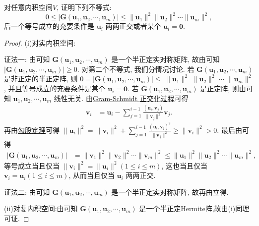 \documentclass[../../main.tex]{subfiles}
\begin{document}
\begin{proposition}\label{proposition:例9.16}
对任意内积空间$V$,
证明下列不等式:
\[
0 \leqslant  |\boldsymbol{G}(\boldsymbol{u}_1,\boldsymbol{u}_2,\cdots,\boldsymbol{u}_m)| \leqslant  \|\boldsymbol{u}_1\|^2\|\boldsymbol{u}_2\|^2\cdots\|\boldsymbol{u}_m\|^2,
\]
后一个等号成立的充要条件是 $\boldsymbol{u}_i$ 两两正交或者某个 $\boldsymbol{u}_i = \boldsymbol{0}$.
\end{proposition}
\begin{proof}
(i)对实内积空间:

{\color{blue}证法一:}
由可知 $\boldsymbol{G}(\boldsymbol{u}_1,\boldsymbol{u}_2,\cdots,\boldsymbol{u}_m)$ 是一个半正定实对称矩阵, 故由可知 $|\boldsymbol{G}(\boldsymbol{u}_1,\boldsymbol{u}_2,\cdots,\boldsymbol{u}_m)| \geqslant  0$. 对第二个不等式, 我们分情况讨论. 若 $\boldsymbol{G}(\boldsymbol{u}_1,\boldsymbol{u}_2,\cdots,\boldsymbol{u}_m)$ 是非正定的半正定阵, 则 $0 = |\boldsymbol{G}(\boldsymbol{u}_1,\boldsymbol{u}_2,\cdots,\boldsymbol{u}_m)| \leqslant $   $\|\boldsymbol{u}_1\|^2$  $\|\boldsymbol{u}_2\|^2$ $\cdots$ $\|\boldsymbol{u}_m\|^2$, 并且等号成立的充要条件是某个 $\boldsymbol{u}_i = \boldsymbol{0}$. 若 $\boldsymbol{G}(\boldsymbol{u}_1,\boldsymbol{u}_2,\cdots,\boldsymbol{u}_m)$ 是正定阵, 则由可知 $\boldsymbol{u}_1,\boldsymbol{u}_2,\cdots,\boldsymbol{u}_m$ 线性无关. 由\hyperref[theorem:Gram-Schmidt正交化方法]{Gram-Schmidt 正交化过程}可得
\begin{align*}
\boldsymbol{v}_i &= \boldsymbol{u}_i - \sum_{j = 1}^{i - 1} \frac{(\boldsymbol{u}_i,\boldsymbol{v}_j)}{\|\boldsymbol{v}_j\|^2} \boldsymbol{v}_j.
\end{align*}
再由\hyperref[corollary:范数性质的相关推广-勾股定理]{勾股定理}可得 $\|\boldsymbol{u}_i\|^2 = \|\boldsymbol{v}_i\|^2 + \sum_{j = 1}^{i - 1} \frac{(\boldsymbol{u}_i,\boldsymbol{v}_j)^2}{\|\boldsymbol{v}_j\|^2} \geqslant  \|\boldsymbol{v}_i\|^2 > 0$. 最后由可得
\begin{align*}
|\boldsymbol{G}(\boldsymbol{u}_1,\boldsymbol{u}_2,\cdots,\boldsymbol{u}_m)| &= \|\boldsymbol{v}_1\|^2\|\boldsymbol{v}_2\|^2\cdots\|\boldsymbol{v}_m\|^2 \leqslant  \|\boldsymbol{u}_1\|^2\|\boldsymbol{u}_2\|^2\cdots\|\boldsymbol{u}_m\|^2,
\end{align*}
等号成立当且仅当 $\|\boldsymbol{v}_i\|^2 = \|\boldsymbol{u}_i\|^2 (1 \leqslant  i \leqslant  m)$, 这也当且仅当 $\boldsymbol{v}_i = \boldsymbol{u}_i (1 \leqslant  i \leqslant  m)$, 从而当且仅当 $\boldsymbol{u}_i$ 两两正交.

{\color{blue}证法二:}
由可知 $\boldsymbol{G}(\boldsymbol{u}_1,\boldsymbol{u}_2,\cdots,\boldsymbol{u}_m)$ 是一个半正定实对称矩阵, 故再由立得.

(ii)对复内积空间:由可知 $\boldsymbol{G}(\boldsymbol{u}_1,\boldsymbol{u}_2,\cdots,\boldsymbol{u}_m)$ 是一个半正定Hermite阵,故由(i)同理可证.

\end{proof}
\end{document}
